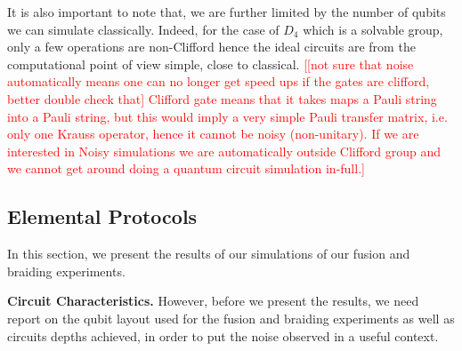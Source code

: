 \documentclass[two column]{article}
\newcommand{\caro}[1]{\textcolor{red}{[#1]}}
\begin{document}
It is also important to note that, we are further limited by the number of qubits we can simulate classically.
Indeed, for the case of $D_4$ which is a solvable group, only a few operations are non-Clifford hence the ideal circuits are from the computational point of view simple, close to classical. 
\caro{[not sure that noise automatically means one can no longer get speed ups if the gates are clifford, better double check that]
Clifford gate means that it takes maps a Pauli string into a Pauli string, but this would imply a very simple Pauli transfer matrix, i.e. only one Krauss operator, hence it cannot be noisy (non-unitary).
If we are interested in Noisy simulations we are automatically outside Clifford group and we cannot get around doing a quantum circuit simulation in-full.}


\subsection{Elemental Protocols}

In this section, we present the results of our simulations of our fusion and braiding experiments.

\textbf{Circuit Characteristics.} However, before we present the results, we need report on the qubit layout used for the fusion and braiding experiments as well as circuits depths achieved, in order to put the noise observed in a useful context.
\end{document}
